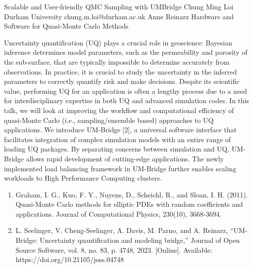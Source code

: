 \begin{talk}
  {Scalable and User-friendly QMC Sampling with UMBridge}%
  {Chung Ming Loi}%
  {Durham University}%
  {chung.m.loi@durham.ac.uk}%
  {Anne Reinarz}%
  {Hardware and Software for Quasi-Monte Carlo Methods}%
    
   
Uncertainty quantification (UQ) plays a crucial role in geoscience: Bayesian inference determines model parameters, such as the permeability and porosity of the sub-surface, that are typically impossible to determine accurately from observations. In practice, it is crucial to study the uncertainty in the inferred parameters to correctly quantify risk and make decisions. Despite its scientific value, performing UQ for an application is often a lengthy process due to a need for interdisciplinary expertise in both UQ and advanced simulation codes. In this talk, we will look at improving the workflow and computational efficiency of quasi-Monte Carlo (i.e., sampling/ensemble based) approaches to UQ applications. We introduce UM-Bridge [2], a universal software interface that facilitates integration of complex simulation models with an entire range of leading UQ packages. By separating concerns between simulation and UQ, UM-Bridge allows rapid development of cutting-edge applications. The newly implemented load balancing framework in UM-Bridge further enables scaling workloads to High Performance Computing clusters.

\begin{enumerate}
    \item[{[1]}] Graham, I. G., Kuo, F. Y., Nuyens, D., Scheichl, R., and Sloan, I. H. (2011). Quasi-Monte Carlo methods for elliptic PDEs with random coefficients and applications. Journal of Computational Physics, 230(10), 3668-3694.
    \item[{[2]}]  L. Seelinger, V. Cheng-Seelinger, A. Davis, M. Parno, and A. Reinarz, “UM-Bridge: Uncertainty quantification and modeling bridge,” Journal of Open Source Software, vol. 8, no. 83, p. 4748, 2023. [Online]. Available: https://doi.org/10.21105/joss.04748
\end{enumerate}

\end{talk}

